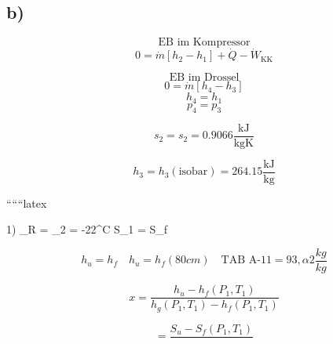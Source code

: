 

\subsection*{b)}

\[
\text{EB im Kompressor}
\]
\[
0 = \dot{m} \left[ h_2 - h_1 \right] + \dot{Q} - \dot{W}_{\text{KK}}
\]

\[
\text{EB im Drossel}
\]
\[
0 = \dot{m} \left[ h_4 - h_3 \right]
\]
\[
h_{4} = h_{1}
\]
\[
p_{4} = p_{3}
\]

\[
s_2 = s_2 = 0.9066 \frac{\text{kJ}}{\text{kgK}}
\]

\[
h_3 = h_3 \left( \text{isobar} \right) = 264.15 \frac{\text{kJ}}{\text{kg}}
\]

``````latex

1) \quad {}_R =  \quad \tau_2 = -22^\circ C \quad S_1 = S_f

\[
h_u = h_f \quad h_{u} = h_f \left(80 cm\right) \quad \text{TAB A-11} = 93, \alpha 2 \frac{kg}{kg}
\]

\[
x = \frac{h_u - h_f \left(P_1, T_1\right)}{h_g \left(P_1, T_1\right) - h_f \left(P_1, T_1\right)}
\]

\[
= \frac{S_u - S_f \left(P_1, T_1\right)}{}
\]